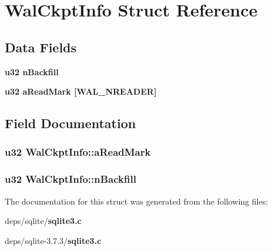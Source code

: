 \section{Wal\-Ckpt\-Info Struct Reference}
\label{structWalCkptInfo}
\subsection*{Data Fields}
\begin{CompactItemize}
\item 
\bf{u32} \bf{n\-Backfill}
\item 
\bf{u32} \bf{a\-Read\-Mark} [WAL\_\-NREADER]
\end{CompactItemize}


\subsection{Field Documentation}
\subsubsection{\setlength{\rightskip}{0pt plus 5cm}\bf{u32} \bf{Wal\-Ckpt\-Info::a\-Read\-Mark}}\label{structWalCkptInfo_154a73a908dc2ed445a7647d7a33fc00}


\subsubsection{\setlength{\rightskip}{0pt plus 5cm}\bf{u32} \bf{Wal\-Ckpt\-Info::n\-Backfill}}\label{structWalCkptInfo_36377736f3c873d5a15b784ecd0530de}




The documentation for this struct was generated from the following files:\begin{CompactItemize}
\item 
deps/sqlite/\bf{sqlite3.c}\item 
deps/sqlite-3.7.3/\bf{sqlite3.c}\end{CompactItemize}
